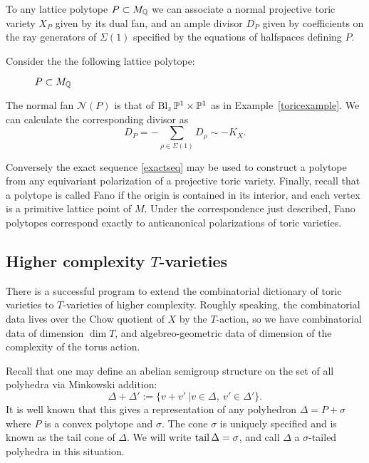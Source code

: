 To any lattice polytope \(P \subset M_{\mathbb{Q}}\) we can associate a normal projective toric variety \(X_P\) given by its dual fan, and an ample divisor \(D_P\) given by coefficients on the ray generators of \(\Sigma(1)\) specified by the equations of halfspaces defining \(P\).
\begin{example}
Consider the the following lattice polytope:
\begin{figure}[h]
\centering
	\caption{$P \subset M_{\mathbb{Q}}$}
\end{figure}
The normal fan \(\mathcal{N}(P)\) is that of \(\operatorname{Bl}_z \mathbb{P}^1 \times \mathbb{P}^1\) as in Example~\ref{toricexample}. We can calculate the corresponding divisor as
\[
D_P = - \sum_{\rho \in \Sigma(1)} D_\rho \sim -K_X.
\]
\end{example}
Conversely the exact sequence \ref{exactseq} may be used to construct a polytope from any equivariant polarization of a projective toric variety. Finally, recall that a polytope is called Fano if the origin is contained in its interior, and each vertex is a primitive lattice point of \(M\). Under the correspondence just described, Fano polytopes correspond exactly to anticanonical polarizations of toric varieties.
\subsection{Higher complexity $T$-varieties}
There is a successful program to extend the combinatorial dictionary of toric varieties to \(T\)-varieties of higher complexity. Roughly speaking, the combinatorial data lives over the Chow quotient of \(X\) by the \(T\)-action, so we have combinatorial data of dimension \(\dim T\), and algebreo-geometric data of dimension of the complexity of the torus action.

Recall that one may define an abelian semigroup structure on the set of all polyhedra via Minkowski addition:
\[
\Delta + \Delta' := \{ v + v' \ | v \in \Delta, \ v' \in \Delta' \}.
\]
It is well known that this gives a representation of any polyhedron \(\Delta = P + \sigma \) where \(P\) is a convex polytope and \(\sigma\). The cone \(\sigma\) is uniquely specified and is known as the tail cone of \(\Delta\). We will write \(\operatorname{tail} \Delta = \sigma\), and call \(\Delta\) a \(\sigma\)-tailed polyhedra in this situation.


